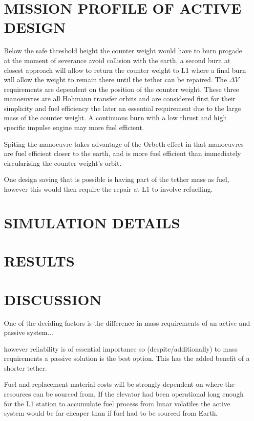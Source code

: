 \documentclass[twocolumn,prl,nobalancelastpage,aps,10pt]{revtex4-1}
\begin{document}
\section{MISSION PROFILE OF ACTIVE DESIGN}

Below the safe threshold height the counter weight would have to burn progade at the moment of severance avoid collision with the earth, a second burn at closest approach will allow to return the counter weight to L1 where a final burn will allow the weight to remain there until the tether can be repaired. The $\Delta V$ requirements are dependent on the position of the counter weight. These three manoeuvres are all Hohmann transfer orbits and are considered first for their simplicity and fuel efficiency the later an essential requirement due to the large mass of the counter weight. A continuous burn with a low thrust and high specific impulse engine may more fuel efficient.

Spiting the manoeuvre takes advantage of the Orbeth effect in that manoeuvres are fuel efficient closer to the earth, and is more fuel efficient than immediately circularising the counter weight's orbit.

One design saving that is possible is having part of the tether mass as fuel, however this would then require the repair at L1 to involve refuelling.

\section{SIMULATION DETAILS}

\section{RESULTS}

\section{DISCUSSION}

One of the deciding factors is the difference in mass requirements of an active and passive system...


however reliability is of essential importance so (despite/additionally) to mass requirements a passive solution is the best option. This has the added benefit of a shorter tether.

Fuel and replacement material costs will be strongly dependent on where the resources can be sourced from. If the elevator had been operational long enough for the L1 station to accumulate fuel process from lunar volatiles the active system would be far cheaper than if fuel had to be sourced from Earth.
\end{document}
